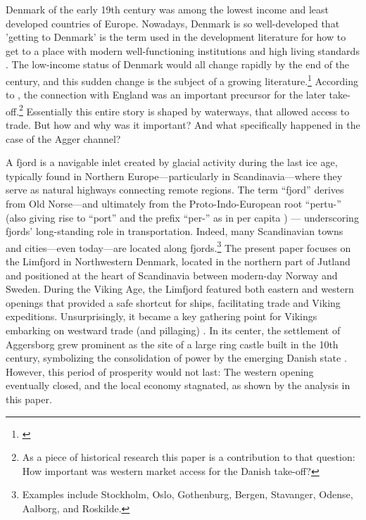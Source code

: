 \documentclass[12pt]{article}
\begin{document}
Denmark of the early 19th century was among the lowest income 
and least developed countries of Europe. Nowadays, Denmark is so well-developed that 'getting to Denmark' is the term used in the development literature for how to get to a place with modern well-functioning institutions and high living standards \citep{fukuyama2011origins}. The low-income status of Denmark would all change rapidly by the end of the century, and this sudden change is the subject of a growing literature.\footnote{\cite{Khaustova2015, Henriksen2006, milkandbutter, gorges2025tracksmodernity, BobergFazlic2023GettingtoDK}} According to \cite{Lampe2015DanesUK}, the connection with England was an important precursor for the later take-off.\footnote{As a piece of historical research this paper is a contribution to that question: How important was western market access for the Danish take-off?} Essentially this entire story is shaped by waterways, that allowed access to trade. But how and why was it important? And what specifically happened in the case of the Agger channel?

A fjord is a navigable inlet created by glacial activity during the last ice age, typically found in Northern Europe—particularly in Scandinavia—where they serve as natural highways connecting remote regions. The term “fjord” derives from Old Norse—and ultimately from the Proto-Indo-European root “pertu-” (also giving rise to “port” and the prefix “per-” as in per capita \citep{EtymFjord}) — underscoring fjords’ long-standing role in transportation. Indeed, many Scandinavian towns and cities—even today—are located along fjords.\footnote{Examples include Stockholm, Oslo, Gothenburg, Bergen, Stavanger, Odense, Aalborg, and Roskilde.} The present paper focuses on the Limfjord in Northwestern Denmark, located in the northern part of Jutland and positioned at the heart of Scandinavia between modern-day Norway and Sweden. During the Viking Age, the Limfjord featured both eastern and western openings that provided a safe shortcut for ships, facilitating trade and Viking expeditions. Unsurprisingly, it became a key gathering point for Vikings embarking on westward trade (and pillaging) \citep{Rasmussen1966}. In its center, the settlement of Aggersborg grew prominent as the site of a large ring castle built in the 10th century, symbolizing the consolidation of power by the emerging Danish state \citep{pedersen2014}. However, this period of prosperity would not last: The western opening eventually closed, and the local economy stagnated, as shown by the analysis in this paper.
\end{document}
